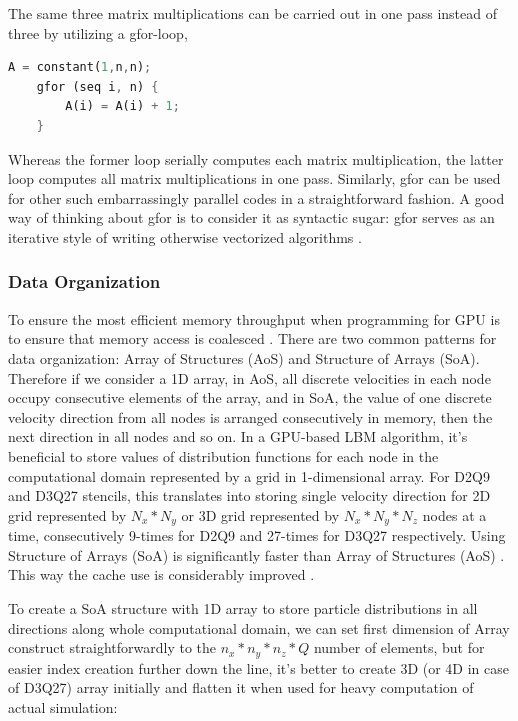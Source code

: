 The same three matrix multiplications can be carried out in one pass instead of three by utilizing a gfor-loop,

\begin{lstlisting}[language=Rust, caption=Pseudo-code with if-statement removed]
	A = constant(1,n,n);
	gfor (seq i, n) {
		A(i) = A(i) + 1;
	}
\end{lstlisting}

Whereas the former loop serially computes each matrix multiplication, the latter loop computes all matrix multiplications in one pass. Similarly, gfor can be used for other such embarrassingly parallel codes in a straightforward fashion. A good way of thinking about gfor is to consider it as syntactic sugar: gfor serves as an iterative style of writing otherwise vectorized algorithms \citep{malcolmArrayFireGPUAcceleration2012a}.

\subsubsection{Data Organization}
To ensure the most efficient memory throughput when programming for GPU is to ensure that memory access is coalesced \cite{tranPerformanceOptimization3D2017}. There are two common patterns for data organization: Array of Structures (AoS) and Structure of Arrays (SoA). Therefore if we consider a 1D array, in AoS, all discrete velocities in each node occupy consecutive elements of the array, and in SoA, the value of one discrete velocity direction from all nodes is arranged consecutively in memory, then the next direction in all nodes and so on. In a GPU-based LBM algorithm, it's beneficial to store values of distribution functions for each node in the computational domain represented by a grid in 1-dimensional array. For D2Q9 and D3Q27 stencils, this translates into storing single velocity direction for 2D grid represented by $N_x * N_y$ or 3D grid represented by $N_x * N_y * N_z$ nodes at a time, consecutively 9-times for D2Q9 and 27-times for D3Q27 respectively. Using Structure of Arrays (SoA) is significantly faster than Array of Structures (AoS) \cite{tranPerformanceOptimization3D2017, delboscOptimizedImplementationLattice2014}. This way the cache use is considerably improved \cite{Mawson2014InteractiveFI}.

To create a SoA structure with 1D array to store particle distributions in all directions along whole computational domain, we can set first dimension of Array construct straightforwardly to the $n_x*n_y*n_z*Q$ number of elements, but for easier index creation further down the line, it's better to create 3D (or 4D in case of D3Q27) array initially and flatten it when used for heavy computation of actual simulation:

